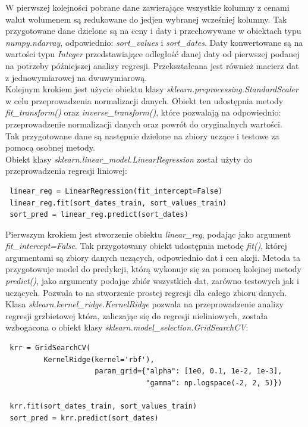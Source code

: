 W pierwszej kolejności pobrane dane zawierające wszystkie kolumny z cenami walut wolumenem są redukowane do jedjen wybranej wcześniej kolumny.
Tak przygotowane dane dzielone są na ceny i daty i przechowywane w obiektach typu \textit{numpy.ndarray}, odpowiednio: \textit{sort\_values} i \textit{sort\_dates}.
Daty konwertowane są na wartości typu \textit{Integer} przedstawiające odległość danej daty od pierwszej podanej na potrzeby późniejszej analizy regresji. Przekształcana jest również macierz dat z jednowymiarowej na dwuwymiarową.\\

Kolejnym krokiem jest użycie obiektu klasy \textit{sklearn.preprocessing.StandardScaler} w celu przeprowadzenia normalizacji danych.
Obiekt ten udostępnia metody \textit{fit\_transform()} oraz \textit{inverse\_transform()}, które pozwalają na odpowiednio: przeprowadzenie normalizacji danych oraz powrót do oryginalnych wartości.\\

Tak przygotowane dane są następnie dzielone na zbiory uczące i testowe za pomocą osobnej metody.\\

Obiekt klasy \textit{sklearn.linear\_model.LinearRegression} został użyty do przeprowadzenia regresji liniowej:
\begin{lstlisting}
 linear_reg = LinearRegression(fit_intercept=False)
 linear_reg.fit(sort_dates_train, sort_values_train)
 sort_pred = linear_reg.predict(sort_dates)
\end{lstlisting}
Pierwszym krokiem jest stworzenie obiektu \textit{linear\_reg}, podając jako argument \textit{fit\_intercept=False}.
Tak przygotowany obiekt udostępnia metodę \textit{fit()}, której argumentami są zbiory danych uczących, odpowiednio dat i cen akcji.
Metoda ta przygotowuje model do predykcji, którą wykonuje się za pomocą kolejnej metody \textit{predict()}, jako argumenty podając zbiór wszystkich dat, zarówno testowych jak i uczących.
Pozwala to na stworzenie prostej regresji dla całego zbioru danych.\\

Klasa \textit{sklearn.kernel\_ridge.KernelRidge} pozwala na przeprowadzenie analizy regresji grzbietowej która, zaliczając się do regresji nieliniowych, została wzbogacona o obiekt klasy \textit{sklearn.model\_selection.GridSearchCV}:
\begin{lstlisting}
 krr = GridSearchCV(
         KernelRidge(kernel='rbf'),
                     param_grid={"alpha": [1e0, 0.1, 1e-2, 1e-3],
                                 "gamma": np.logspace(-2, 2, 5)})

 krr.fit(sort_dates_train, sort_values_train)
 sort_pred = krr.predict(sort_dates)
\end{lstlisting}

